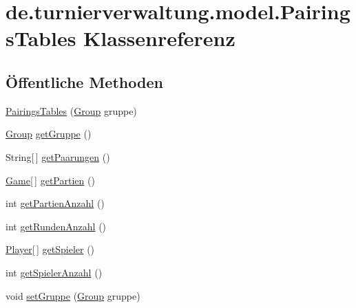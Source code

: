 \hypertarget{classde_1_1turnierverwaltung_1_1model_1_1_pairings_tables}{}\section{de.\+turnierverwaltung.\+model.\+Pairings\+Tables Klassenreferenz}
\label{classde_1_1turnierverwaltung_1_1model_1_1_pairings_tables}
\subsection*{Öffentliche Methoden}
\begin{DoxyCompactItemize}
\item 
\hyperlink{classde_1_1turnierverwaltung_1_1model_1_1_pairings_tables_a9a64133c512bcd1d93031d8a60f5378f}{Pairings\+Tables} (\hyperlink{classde_1_1turnierverwaltung_1_1model_1_1_group}{Group} gruppe)
\item 
\hyperlink{classde_1_1turnierverwaltung_1_1model_1_1_group}{Group} \hyperlink{classde_1_1turnierverwaltung_1_1model_1_1_pairings_tables_aba2aa39d3c8ab909592f2f512b0c9053}{get\+Gruppe} ()
\item 
String\mbox{[}$\,$\mbox{]} \hyperlink{classde_1_1turnierverwaltung_1_1model_1_1_pairings_tables_ad79adcf302c1b588b24762a786faf0a8}{get\+Paarungen} ()
\item 
\hyperlink{classde_1_1turnierverwaltung_1_1model_1_1_game}{Game}\mbox{[}$\,$\mbox{]} \hyperlink{classde_1_1turnierverwaltung_1_1model_1_1_pairings_tables_a47787c9daa89537d897eb4624e2d20b8}{get\+Partien} ()
\item 
int \hyperlink{classde_1_1turnierverwaltung_1_1model_1_1_pairings_tables_a5073d00edda4ebeed3e781a467d75ae3}{get\+Partien\+Anzahl} ()
\item 
int \hyperlink{classde_1_1turnierverwaltung_1_1model_1_1_pairings_tables_a484c59726e702d18e27a6ccf2800b177}{get\+Runden\+Anzahl} ()
\item 
\hyperlink{classde_1_1turnierverwaltung_1_1model_1_1_player}{Player}\mbox{[}$\,$\mbox{]} \hyperlink{classde_1_1turnierverwaltung_1_1model_1_1_pairings_tables_a9012d0aeecf02125731a511416d87ad2}{get\+Spieler} ()
\item 
int \hyperlink{classde_1_1turnierverwaltung_1_1model_1_1_pairings_tables_a619a85e6e76cf8803e76f2ea11913f3a}{get\+Spieler\+Anzahl} ()
\item 
void \hyperlink{classde_1_1turnierverwaltung_1_1model_1_1_pairings_tables_a94879f17deeb411b437d763b4b6585ee}{set\+Gruppe} (\hyperlink{classde_1_1turnierverwaltung_1_1model_1_1_group}{Group} gruppe)

\end{DoxyCompactItemize}
